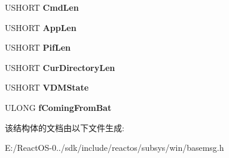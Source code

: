 \begin{DoxyCompactItemize}
U\+S\+H\+O\+RT {\bfseries Cmd\+Len}
\item 
\mbox{\label{struct___b_a_s_e___g_e_t___n_e_x_t___v_d_m___c_o_m_m_a_n_d_acd460a263b2ed010355c4e4d9e0af6a5}} 
U\+S\+H\+O\+RT {\bfseries App\+Len}
\item 
\mbox{\label{struct___b_a_s_e___g_e_t___n_e_x_t___v_d_m___c_o_m_m_a_n_d_ad6f4dd42cf6775d38ca896fc1afc6294}} 
U\+S\+H\+O\+RT {\bfseries Pif\+Len}
\item 
\mbox{\label{struct___b_a_s_e___g_e_t___n_e_x_t___v_d_m___c_o_m_m_a_n_d_ae3a791498f406ca1884968b568582e53}} 
U\+S\+H\+O\+RT {\bfseries Cur\+Directory\+Len}
\item 
\mbox{\label{struct___b_a_s_e___g_e_t___n_e_x_t___v_d_m___c_o_m_m_a_n_d_ad8e82e35e028304fd5718d29516619cf}} 
U\+S\+H\+O\+RT {\bfseries V\+D\+M\+State}
\item 
\mbox{\label{struct___b_a_s_e___g_e_t___n_e_x_t___v_d_m___c_o_m_m_a_n_d_a55570be5e3fba4fe5d12537aeea59448}} 
U\+L\+O\+NG {\bfseries f\+Coming\+From\+Bat}
\end{DoxyCompactItemize}


该结构体的文档由以下文件生成\+:\begin{DoxyCompactItemize}
\item 
E\+:/\+React\+O\+S-\/0../sdk/include/reactos/subsys/win/basemsg.\+h\end{DoxyCompactItemize}
